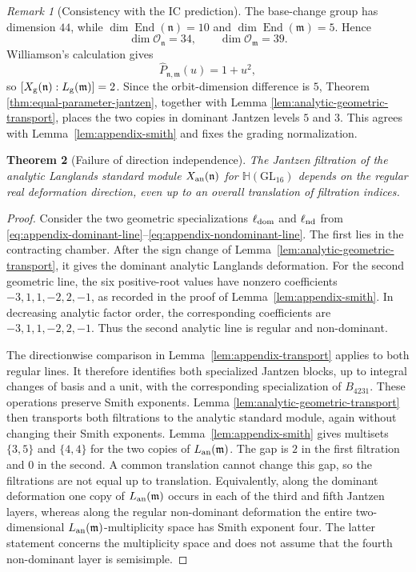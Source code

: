 \documentclass[11pt]{amsart}
\newtheorem{theorem}{Theorem}[section]
\theoremstyle{definition}
\theoremstyle{remark}
\newtheorem{remark}[theorem]{Remark}
\newcommand{\Hh}{\mathbb H}
\begin{document}
\begin{remark}[Consistency with the IC prediction]
The base-change group has dimension $44$, while
$\dim\operatorname{End}(\mathfrak n)=10$ and
$\dim\operatorname{End}(\mathfrak m)=5$.  Hence
\[
 \dim\mathcal O_{\mathfrak n}=34,\qquad
 \dim\mathcal O_{\mathfrak m}=39.
\]
Williamson's calculation gives
\[
 \widehat P_{\mathfrak n,\mathfrak m}(u)=1+u^2,
\]
so $[X_{\rm g}(\mathfrak n):L_{\rm g}(\mathfrak m)]=2$.  Since the
orbit-dimension difference is $5$, Theorem
\ref{thm:equal-parameter-jantzen}, together with Lemma
\ref{lem:analytic-geometric-transport}, places the two copies in dominant
Jantzen levels $5$ and $3$.  This agrees with
Lemma~\ref{lem:appendix-smith} and fixes the grading normalization.
\end{remark}

\begin{theorem}[Failure of direction independence]
\label{thm:direction-counterexample}
The Jantzen filtration of the analytic Langlands standard module
$X_{\rm an}(\mathfrak n)$ for $\Hh(\mathrm{GL}_{16})$ depends on the regular
real deformation direction, even up to an overall translation of filtration
indices.
\end{theorem}

\begin{proof}
Consider the two geometric specializations $\ell_{\rm dom}$ and
$\ell_{\rm nd}$ from
\eqref{eq:appendix-dominant-line}--\eqref{eq:appendix-nondominant-line}.
The first lies in the contracting chamber.  After the sign change of
Lemma~\ref{lem:analytic-geometric-transport}, it gives the dominant analytic
Langlands deformation.  For the second geometric line, the six positive-root
values have nonzero coefficients
$-3,1,1,-2,2,-1$, as recorded in the proof of
Lemma~\ref{lem:appendix-smith}.  In decreasing analytic factor order, the
corresponding coefficients are $-3,1,1,-2,2,-1$.  Thus the second analytic
line is regular and non-dominant.

The directionwise comparison in
Lemma~\ref{lem:appendix-transport} applies to both regular lines.  It therefore
identifies both specialized Jantzen blocks, up to integral changes of basis
and a unit, with the corresponding specialization of $B_{4231}$.  These
operations preserve Smith exponents.  Lemma
\ref{lem:analytic-geometric-transport} then transports both filtrations to
the analytic standard module, again without changing their Smith exponents.
Lemma~\ref{lem:appendix-smith} gives
multisets $\{3,5\}$ and $\{4,4\}$ for the two copies of
$L_{\rm an}(\mathfrak m)$.  The gap is $2$ in the first filtration and $0$ in the
second.  A common translation cannot change this gap, so the filtrations are
not equal up to translation.  Equivalently, along the dominant deformation
one copy of $L_{\rm an}(\mathfrak m)$ occurs in each of the third and fifth
Jantzen layers, whereas along the regular non-dominant deformation the
entire two-dimensional $L_{\rm an}(\mathfrak m)$-multiplicity space has
Smith exponent four.
The latter statement concerns the multiplicity space and does not assume
that the fourth non-dominant layer is semisimple.
\end{proof}
\end{document}
